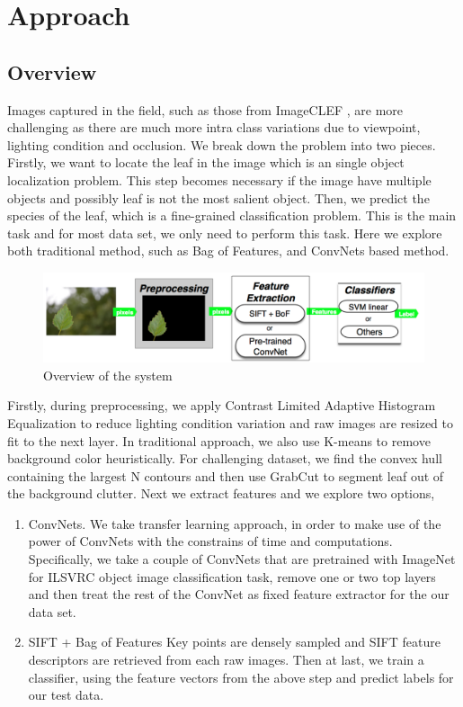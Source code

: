 \documentclass[journal, 10pt]{IEEEtran}
\begin{document}
\section{Approach}

\subsection{Overview}
Images captured in the field, such as those from ImageCLEF \cite{ImageCLEF2013}, are more challenging as there are much more intra class variations due to viewpoint, lighting condition and occlusion.
We break down the problem into two pieces. Firstly, we want to locate the leaf in the image which is an single object localization problem.  This step becomes necessary if the image have multiple objects and possibly leaf is not the most salient object.  Then, we predict the species of the leaf, which is a fine-grained classification problem. This is the main task and for most data set, we only need to perform this task. Here we explore both traditional method, such as Bag of Features,  and ConvNets based method.

\begin{figure}[H]
  \center
  \includegraphics[scale=0.2]{overview}
  \caption{ Overview of the system }
  \label{fig:pipeline}
\end{figure}

  Firstly, during preprocessing, we apply Contrast Limited Adaptive Histogram Equalization to reduce lighting condition variation and raw images are resized to fit to the next layer. In traditional approach, we also use K-means to remove background color heuristically. For challenging dataset, we find the convex hull containing the largest N contours and then use GrabCut to segment leaf out of the background clutter.
  Next we extract features and we explore two options,
\begin{enumerate}
  \item ConvNets.
    We take transfer learning approach, in order to make use of the power of ConvNets with the constrains of time and computations. Specifically, we take a couple of ConvNets that are pretrained with ImageNet for ILSVRC object image classification task, remove one or two top layers and then treat the rest of the ConvNet as fixed feature extractor for the our data set.


  \item SIFT + Bag of Features
    Key points are densely sampled and SIFT feature descriptors are retrieved from each raw images. Then at last, we train a classifier, using the feature vectors from the above step and predict labels for our test data.
\end{enumerate}
\end{document}

